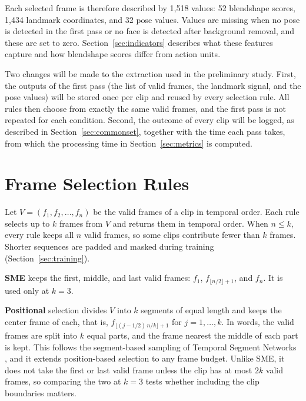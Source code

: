 Each selected frame is therefore described by 1,518 values: 52 blendshape scores, 1,434 landmark coordinates, and 32 pose values. Values are missing when no pose is detected in the first pass or no face is detected after background removal, and these are set to zero. Section~\ref{sec:indicators} describes what these features capture and how blendshape scores differ from action units.

Two changes will be made to the extraction used in the preliminary study. First, the outputs of the first pass (the list of valid frames, the landmark signal, and the pose values) will be stored once per clip and reused by every selection rule. All rules then choose from exactly the same valid frames, and the first pass is not repeated for each condition. Second, the outcome of every clip will be logged, as described in Section~\ref{sec:commonset}, together with the time each pass takes, from which the processing time in Section~\ref{sec:metrics} is computed.



\section{Frame Selection Rules}
\label{sec:selection}

Let $V = (f_1, f_2, \dots, f_n)$ be the valid frames of a clip in temporal order. Each rule selects up to $k$ frames from $V$ and returns them in temporal order. When $n \le k$, every rule keeps all $n$ valid frames, so some clips contribute fewer than $k$ frames. Shorter sequences are padded and masked during training (Section~\ref{sec:training}).

\textbf{SME} keeps the first, middle, and last valid frames: $f_1$, $f_{\lfloor n/2 \rfloor + 1}$, and $f_n$. It is used only at $k = 3$.

\textbf{Positional} selection divides $V$ into $k$ segments of equal length and keeps the center frame of each, that is, $f_{\lfloor (j - 1/2)\,n/k \rfloor + 1}$ for $j = 1, \dots, k$. In words, the valid frames are split into $k$ equal parts, and the frame nearest the middle of each part is kept. This follows the segment-based sampling of Temporal Segment Networks \cite{wang2016}, and it extends position-based selection to any frame budget. Unlike SME, it does not take the first or last valid frame unless the clip has at most $2k$ valid frames, so comparing the two at $k = 3$ tests whether including the clip boundaries matters.


